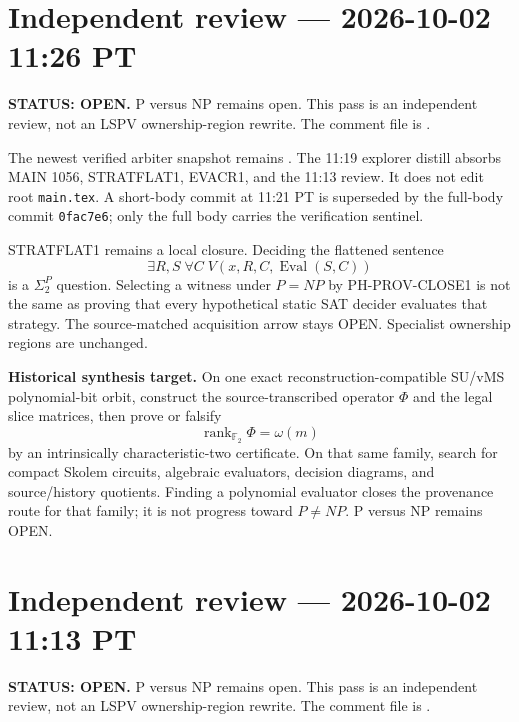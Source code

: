 \documentclass[11pt]{article}
\begin{document}
\section{Independent review --- 2026-10-02 11:26 PT}
\textbf{STATUS: OPEN.} P versus NP remains open. This pass is an independent review, not an
LSPV ownership-region rewrite. The comment file is
.

The newest verified arbiter snapshot remains
. The 11:19 explorer distill
absorbs MAIN 1056, STRATFLAT1, EVACR1, and the 11:13 review. It does not edit root
\texttt{main.tex}. A short-body commit at 11:21 PT is superseded by the full-body commit
\texttt{0fac7e6}; only the full body carries the verification sentinel.

STRATFLAT1 remains a local closure. Deciding the flattened sentence
\[
\exists R,S\;\forall C\;V(x,R,C,\operatorname{Eval}(S,C))
\]
is a \(\Sigma_2^P\) question. Selecting a witness under \(P=NP\) by PH-PROV-CLOSE1 is not the
same as proving that every hypothetical static SAT decider evaluates that strategy. The
source-matched acquisition arrow stays OPEN. Specialist ownership regions are unchanged.

\begin{candidatebox}
\textbf{Historical synthesis target.}
On one exact reconstruction-compatible SU/vMS polynomial-bit orbit, construct the
source-transcribed operator \(\Phi\) and the legal slice matrices, then prove or falsify
\[
\operatorname{rank}_{\mathbb F_2}\Phi=\omega(m)
\]
by an intrinsically characteristic-two certificate. On that same family, search for compact
Skolem circuits, algebraic evaluators, decision diagrams, and source/history quotients.
Finding a polynomial evaluator closes the provenance route for that family; it is not progress
toward \(P\neq NP\). P versus NP remains OPEN.
\end{candidatebox}



\section{Independent review --- 2026-10-02 11:13 PT}
\textbf{STATUS: OPEN.} P versus NP remains open. This pass is an independent review, not an
LSPV ownership-region rewrite. The comment file is
.
\end{document}
